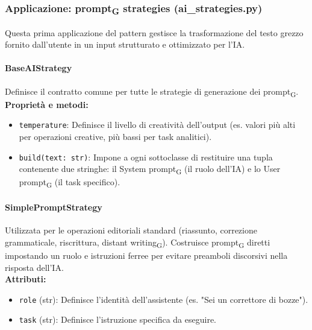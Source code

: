 \documentclass[11pt,a4paper]{article}
\newcommand{\gls}[1]{#1\textsubscript{G}}
\begin{document}
\subsubsection{Applicazione: \gls{prompt} strategies (ai\_strategies.py)}
Questa prima applicazione del pattern gestisce la trasformazione del testo grezzo fornito dall'utente in un input strutturato e ottimizzato per l'IA.

\paragraph{BaseAIStrategy}
Definisce il contratto comune per tutte le strategie di generazione dei \gls{prompt}.
\textbf{Proprietà e metodi:}
\begin{itemize}
    \item \texttt{temperature}: Definisce il livello di creatività dell'output (es. valori più alti per operazioni creative, più bassi per task analitici).
    \item \texttt{build(text: str)}: Impone a ogni sottoclasse di restituire una tupla contenente due stringhe: il \gls{System prompt} (il ruolo dell'IA) e lo \gls{User prompt} (il task specifico).
\end{itemize}

\paragraph{SimplePromptStrategy}
Utilizzata per le operazioni editoriali standard (riassunto, correzione grammaticale, riscrittura, \gls{distant writing}). Costruisce \gls{prompt} diretti impostando un ruolo e istruzioni ferree per evitare preamboli discorsivi nella risposta dell'IA.
\\ \textbf{Attributi:}
\begin{itemize}
    \item \texttt{role} (str): Definisce l'identità dell'assistente (es. "Sei un correttore di bozze").
    \item \texttt{task} (str): Definisce l'istruzione specifica da eseguire.
\end{itemize}
\end{document}
